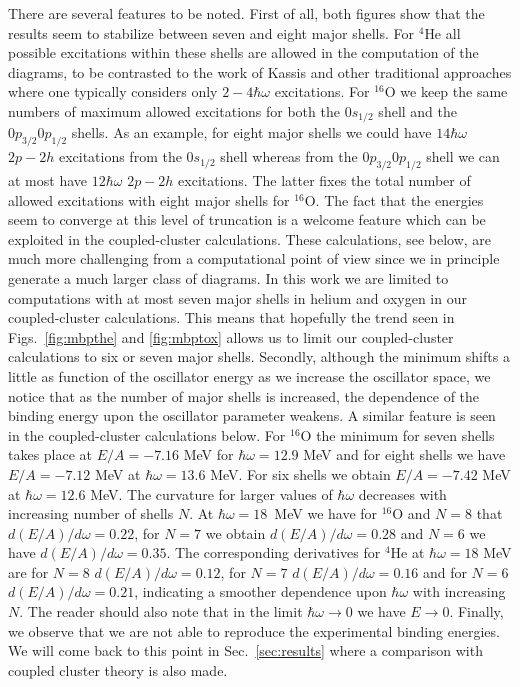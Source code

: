 \documentclass[aps,prc,twocolumn,floatfix]{revtex4}
\begin{document}
There are several features to be noted. First of all, both figures show that the results
seem to stabilize between seven and eight  
major shells. For $^{4}$He all possible excitations within these shells
are allowed in the computation of the diagrams, to be contrasted to the work of 
Kassis \cite{kassis72} and other traditional approaches \cite{hko95} where one typically
considers only $2-4\hbar\omega$ excitations. For $^{16}$O we keep the same numbers
of maximum allowed excitations for both the $0s_{1/2}$ shell and the $0p_{3/2}0p_{1/2}$ shells.
As an example, 
for eight major shells we could have $14\hbar\omega$ $2p-2h$ excitations from the $0s_{1/2}$  shell
whereas from the   $0p_{3/2}0p_{1/2}$ shell we can at most have $12\hbar\omega$ $2p-2h$
excitations. The latter fixes the total number of allowed excitations with eight major
shells for $^{16}$O. 
The fact that the energies seem to converge at this level of truncation is a welcome
feature which can be exploited in the coupled-cluster calculations. These calculations,
see below, are much more challenging from a computational point of view since we in principle
generate a much larger class of diagrams. In this work we are 
limited to computations
with at most seven major shells in helium and  
oxygen in our
coupled-cluster calculations. This 
means that hopefully the trend seen in 
Figs.~\ref{fig:mbpthe} and \ref{fig:mbptox} allows us 
to limit our coupled-cluster
calculations to six or seven major shells. 
Secondly, although the minimum shifts a little 
as function of the oscillator energy as we increase the
oscillator space, we notice
that as the number of major shells is increased, the 
dependence of the binding energy 
upon the oscillator parameter weakens. A similar 
feature is seen in the coupled-cluster calculations
below.  
For $^{16}$O the minimum for seven shells 
takes place at $E/A=-7.16$ MeV for $\hbar\omega = 12.9$ MeV 
and for eight shells we have   $E/A=-7.12$ MeV at $\hbar\omega = 13.6$ MeV. For six shells
we obtain  $E/A=-7.42$ MeV at $\hbar\omega = 12.6$ MeV. 
The curvature for larger values of $\hbar\omega$ decreases with increasing number of shells $N$.
At $\hbar\omega =18$~MeV we have for $^{16}$O and $N=8$ that $d(E/A)/d\omega=0.22$, for 
$N=7$ we obtain $d(E/A)/d\omega=0.28$
and $N=6$ we have $d(E/A)/d\omega=0.35$. 
The corresponding derivatives  for $^{4}$He at $\hbar\omega=18$ MeV
are  for $N=8$ $d(E/A)/d\omega=0.12$, for 
$N=7$ $d(E/A)/d\omega=0.16$
and for $N=6$ $d(E/A)/d\omega=0.21$, indicating a smoother dependence upon $\hbar\omega$ with
increasing $N$.
The reader should also note that 
in the limit $\hbar\omega \rightarrow 0$ we have
$E\rightarrow 0$.  
Finally, we observe that we are not able to 
reproduce the experimental binding energies.
We will come back to this point in Sec.~\ref{sec:results} where a comparison
with coupled cluster theory is also made.
\end{document}
